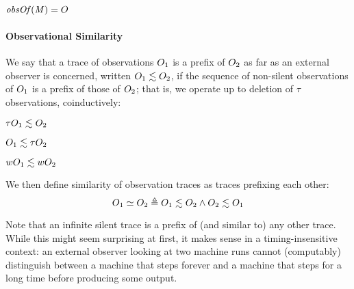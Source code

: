 \documentclass[acmsmall,review,anonymous]{acmart}\settopmatter{printfolios=true,printccs=false,printacmref=false}
\begin{document}
         {\(\mathit{obsOf}(\mathit{M}) = O\)}

\paragraph*{Observational Similarity}

We say that a trace of observations $O_1$ is a prefix of $O_2$
as far as an external observer is concerned, written \(O_1 \lesssim
O_2\), if the sequence of
non-silent observations of $O_1$ is a prefix of those of
$O_2$; that is, we operate up to deletion of \(\tau\) observations,
coinductively:

\begin{minipage}{.3\textwidth}
  \judgment{}{\(\obsT \lesssim \obsT\)}
\end{minipage}
\begin{minipage}{.3\textwidth}
  \judgment{}{\(\tau \lesssim \obsT\)}
\end{minipage}
\begin{minipage}{.3\textwidth}
\end{minipage}

\begin{minipage}{.3\textwidth}
           {\(\tau O_1 \lesssim O_2\)}
\end{minipage}
\begin{minipage}{.3\textwidth}
           {\(O_1 \lesssim \tau O_2\)}
\end{minipage}
\begin{minipage}{.3\textwidth}
           {\(wO_1 \lesssim wO_2\)}
\end{minipage}

\smallskip
We then define similarity of observation traces as traces prefixing each other:
\[O_1 \simeq O_2 \triangleq O_1 \lesssim O_2 \land O_2 \lesssim O_1\]
%

Note that an infinite silent trace is a
prefix of (and similar to) any other trace. While this might seem
surprising at first, it makes sense in a timing-insensitive context:
an external observer looking at two machine runs cannot (computably)
distinguish between a machine that steps forever and a machine that
steps for a long time before producing some output.
\end{document}
